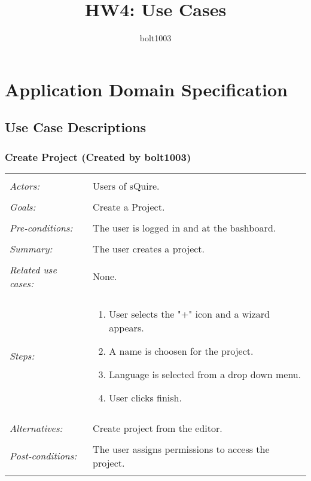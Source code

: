 \documentclass[11pt]{report}
\title{HW4: Use Cases}
\author{bolt1003}
\begin{document}
\maketitle

\chapter{Application Domain Specification}

\section{Use Case Descriptions}

\subsection{Create Project (Created by bolt1003)}
\begin{tabular}{ p{2cm} p{12cm} }
 \hline
 \\
 \textit{Actors:} & Users of sQuire. \\ 
 \\
 \textit{Goals:} & Create a Project. \\
 \\
 \textit{Pre-conditions:} & The user is logged in and at the bashboard. \\
 \\
 \textit{Summary:} & The user creates a project. \\ 
 \\
 \textit{Related use cases:} & None. \\ 
 \\
 \textit{Steps:} & \begin{enumerate}
  \item User selects the "+" icon and a wizard appears.
  \item A name is choosen for the project.
  \item Language is selected from a drop down menu.
  \item User clicks finish.
 \end{enumerate} \\
 \\
 \textit{Alternatives:} & Create project from the editor. \\
 \\
 \textit{Post-conditions:} & The user assigns permissions to access the project. \\
 \\
\hline
\end{tabular}
\end{document}

